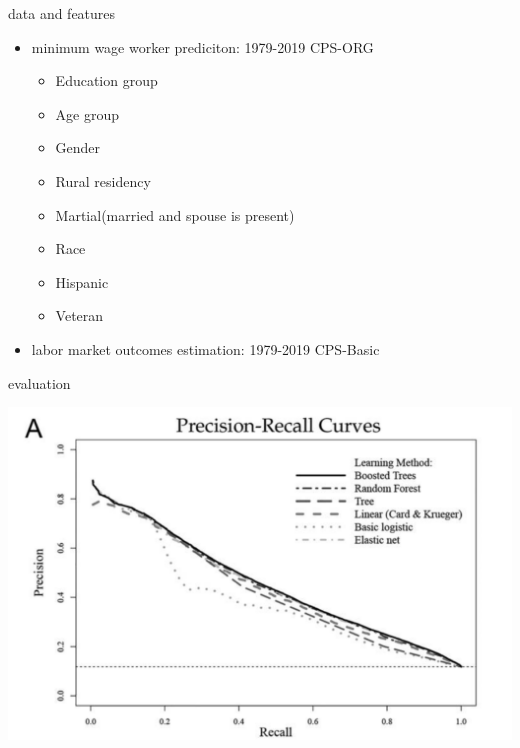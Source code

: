 \documentclass[
  ignorenonframetext,
]{beamer}
\begin{document}
\begin{frame}{data and features}
  \begin{itemize}
    \item minimum wage worker prediciton: 1979-2019 CPS-ORG
    \begin{itemize}
      \item Education group
      \item Age group
      \item Gender
      \item Rural residency
      \item Martial(married and spouse is present)
      \item Race 
      \item Hispanic
      \item Veteran
    \end{itemize}
    \item labor market outcomes estimation: 1979-2019 CPS-Basic
  \end{itemize}
\end{frame}


\begin{frame}{evaluation}
  \begin{center}
    \includegraphics{figure/pdf/evaluation.png}
  \end{center}
\end{frame}
\end{document}
